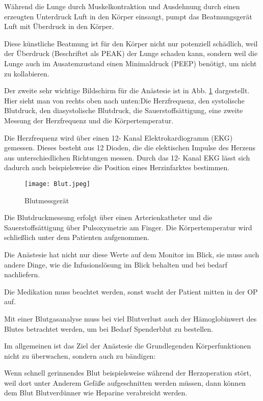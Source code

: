 \documentclass[11pt,a4paper,titlepage]{scrartcl}
\begin{document}
Während die Lunge durch Muskelkontraktion und Ausdehnung durch einen erzeugten Unterdruck Luft in den Körper einsaugt, pumpt das Beatmungsgerät Luft mit Überdruck in den Körper. \medskip

Diese künstliche Beatmung ist für den Körper nicht nur potenziell schädlich, weil der Überdruck (Beschriftet als PEAK) der Lunge schaden kann, sondern weil die Lunge auch im Ausatemzustand einen Minimaldruck (PEEP) benötigt, um nicht zu kollabieren. \medskip

Der zweite sehr wichtige Bildschirm für die Anästesie ist in Abb. \ref{fig:Blut} dargestellt. Hier sieht man von rechts oben nach unten:Die Herzfrequenz, den systolische Blutdruck, den diasystolische  Blutdruck, die Sauerstoffsättigung, eine zweite Messung der Herzfrequenz und die Körpertemperatur. \medskip

Die Herzfrequenz wird über einen 12- Kanal Elektrokardiogramm (EKG) gemessen. Dieses besteht aus 12 Dioden, die die elektischen Impulse des Herzens aus unterschiedlichen Richtungen messen. Durch das 12- Kanal EKG lässt sich dadurch auch beispielsweise die Position eines Herzinfarktes bestimmen. \medskip

 \begin{figure}
        \centering
        \texttt{[image: Blut.jpeg]}
        \caption{Blutmessgerät}
        \label{fig:Blut}
        \centering
        \end{figure}
\newpage

Die Blutdruckmessung erfolgt über einen Arterienkatheter und die Sauerstoffsättigung über Pulsoxymetrie am Finger. Die Körpertemperatur wird schließlich unter dem Patienten aufgenommen.\medskip

Die Anästesie hat nicht nur diese Werte auf dem Monitor im Blick, sie muss auch andere Dinge, wie die Infusionslösung im Blick behalten und bei bedarf nachliefern. \medskip

Die Medikation muss beachtet werden, sonst wacht der Patient mitten in der OP auf. \medskip

Mit einer Blutgasanalyse muss bei viel Blutverlust auch der Hämoglobinwert des Blutes betrachtet werden, um bei Bedarf Spenderblut zu bestellen. \medskip

Im allgemeinen ist das Ziel der Anästesie die Grundlegenden Körperfunktionen nicht zu überwachen, sondern auch zu bändigen: \medskip

Wenn schnell gerinnendes Blut beispielsweise während der Herzoperation stört, weil dort unter Anderem Gefäße aufgeschnitten werden müssen, dann können dem Blut Blutverdünner wie Heparine verabreicht werden. \medskip
\end{document}
